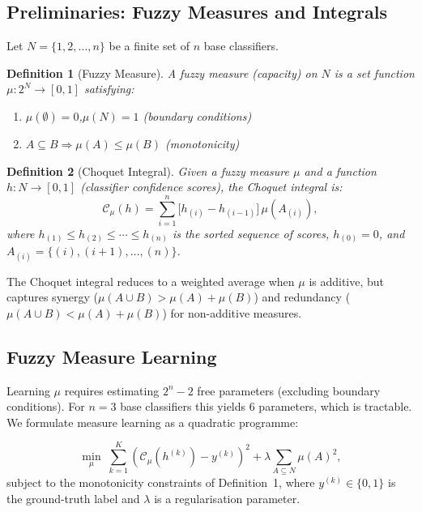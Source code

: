 \documentclass[10pt,twocolumn]{article}
\newtheorem{definition}{Definition}
\begin{document}
\subsection{Preliminaries: Fuzzy Measures and Integrals}

Let $N = \{1, 2, \ldots, n\}$ be a finite set of $n$ base classifiers.

\begin{definition}[Fuzzy Measure]
A \emph{fuzzy measure} (capacity) on $N$ is a set function
$\mu: 2^{N} \rightarrow [0,1]$ satisfying:
\begin{enumerate}
  \item $\mu(\emptyset) = 0$,\quad $\mu(N) = 1$ \hfill(boundary conditions)
  \item $A \subseteq B \Rightarrow \mu(A) \leq \mu(B)$ \hfill(monotonicity)
\end{enumerate}
\end{definition}

\begin{definition}[Choquet Integral]
Given a fuzzy measure $\mu$ and a function $h: N \rightarrow [0,1]$ (classifier confidence
scores), the \emph{Choquet integral} is:
\begin{equation}
  \mathcal{C}_{\mu}(h) = \sum_{i=1}^{n}
    \bigl[h_{(i)} - h_{(i-1)}\bigr]\,\mu\!\left(A_{(i)}\right),
  \label{eq:choquet}
\end{equation}
where $h_{(1)} \leq h_{(2)} \leq \cdots \leq h_{(n)}$ is the sorted sequence of scores,
$h_{(0)} = 0$, and $A_{(i)} = \{(i), (i+1), \ldots, (n)\}$.
\end{definition}

The Choquet integral reduces to a weighted average when $\mu$ is additive, but captures
synergy ($\mu(A\cup B) > \mu(A)+\mu(B)$) and redundancy ($\mu(A\cup B) < \mu(A)+\mu(B)$)
for non-additive measures.

\subsection{Fuzzy Measure Learning}

Learning $\mu$ requires estimating $2^n - 2$ free parameters (excluding boundary conditions).
For $n = 3$ base classifiers this yields 6 parameters, which is tractable. We formulate
measure learning as a quadratic programme:

\begin{equation}
  \min_{\mu} \;\sum_{k=1}^{K}\!\left(\mathcal{C}_{\mu}(h^{(k)}) - y^{(k)}\right)^{2}
  + \lambda \sum_{A \subseteq N} \mu(A)^{2},
  \label{eq:opt}
\end{equation}
subject to the monotonicity constraints of Definition~1, where $y^{(k)} \in \{0,1\}$ is the
ground-truth label and $\lambda$ is a regularisation parameter.
\end{document}
